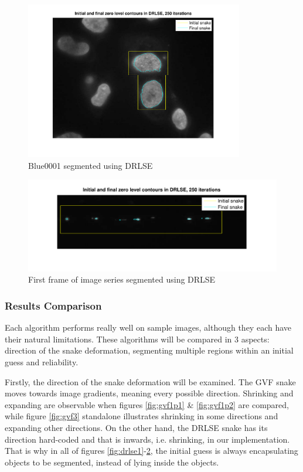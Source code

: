 \documentclass{article}
\begin{document}
\begin{figure}
\centering
\includegraphics[width=0.85\textwidth]{figures/drlse2.pdf}
\caption{Blue0001 segmented using DRLSE}
\label{fig:drlse2}
\end{figure}


\begin{figure}
\centering
\includegraphics[width=1\textwidth]{figures/drlse3.pdf}
\caption{First frame of image series segmented using DRLSE}
\label{fig:drlse3}
\end{figure}



\subsubsection*{Results Comparison}
Each algorithm performs really well on sample images, although they each have their natural limitations. These algorithms will be compared in 3 aspects: direction of the snake deformation, segmenting multiple regions within an initial guess and reliability.

Firstly, the direction of the snake deformation will be examined. The GVF snake moves towards image gradients, meaning every possible direction. Shrinking and expanding are observable when figures \ref{fig:gvf1p1} \& \ref{fig:gvf1p2} are compared, while figure \ref{fig:gvf3} standalone illustrates shrinking in some directions and expanding other directions. On the other hand, the DRLSE snake has its direction hard-coded and that is inwards,  i.e. shrinking, in our implementation. That is why in all of figures \ref{fig:drlse1}-\ref{fig:drlse3}, the initial guess is always encapsulating objects to be segmented, instead of lying inside the objects.
\end{document}
